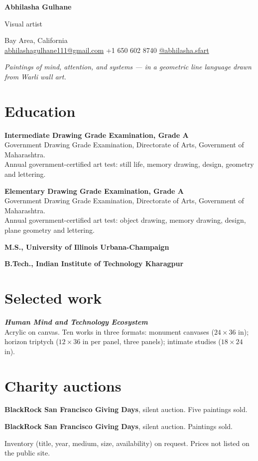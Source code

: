 \documentclass[11pt,letterpaper]{article}
\newcommand{\cvitem}[2]{%
  \par\noindent
  \makebox[1.15in][l]{\textcolor{muted}{\small #1}}%
  \parbox[t]{\dimexpr\textwidth-1.15in\relax}{#2}\par
  \vspace{7pt}%
}
\begin{document}
{\Huge\bfseries Abhilasha Gulhane}

\vspace{6pt}
{\large Visual artist}

\vspace{8pt}
\textcolor{muted}{Bay Area, California}\\[2pt]
\href{mailto:abhilashagulhane111@gmail.com}{abhilashagulhane111@gmail.com}
\;\textbullet\;
+1 650 602 8740
\;\textbullet\;
\href{https://www.instagram.com/abhilasha.sfart/}{@abhilasha.sfart}

\vspace{6pt}
\textit{Paintings of mind, attention, and systems --- in a geometric line language drawn from Warli wall art.}

\section{Education}

\cvitem{2009}{%
  \textbf{Intermediate Drawing Grade Examination, Grade A}\\
  Government Drawing Grade Examination, Directorate of Arts, Government of Maharashtra.\\
  {\small\color{muted}Annual government-certified art test: still life, memory drawing, design, geometry and lettering.}}

\cvitem{2007}{%
  \textbf{Elementary Drawing Grade Examination, Grade A}\\
  Government Drawing Grade Examination, Directorate of Arts, Government of Maharashtra.\\
  {\small\color{muted}Annual government-certified art test: object drawing, memory drawing, design, plane geometry and lettering.}}

\cvitem{2020}{\textbf{M.S., University of Illinois Urbana-Champaign}}

\cvitem{2018}{\textbf{B.Tech., Indian Institute of Technology Kharagpur}}

\section{Selected work}

\cvitem{2026}{%
  \textit{\textbf{Human Mind and Technology Ecosystem}}\\
  Acrylic on canvas. Ten works in three formats: monument canvases ($24 \times 36$ in); horizon triptych ($12 \times 36$ in per panel, three panels); intimate studies ($18 \times 24$ in).}

\section{Charity auctions}

\cvitem{2024}{%
  \textbf{BlackRock San Francisco Giving Days}, silent auction. Five paintings sold.}

\cvitem{2023}{%
  \textbf{BlackRock San Francisco Giving Days}, silent auction. Paintings sold.}

\vspace{16pt}
{\small\color{muted}Inventory (title, year, medium, size, availability) on request. Prices not listed on the public site.}
\end{document}
